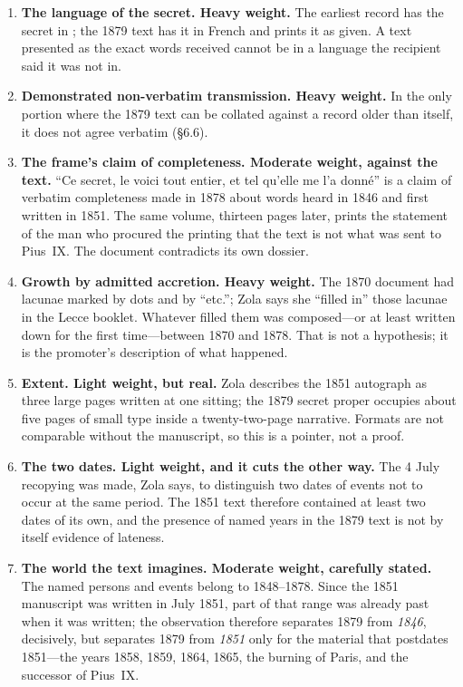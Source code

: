 \begin{enumerate}[leftmargin=1.4em,itemsep=0.3em,topsep=0.3em]
\item \textbf{The language of the secret. Heavy weight.} The
earliest record has the secret in ; the 1879 text has
it in French and prints it as given. A text presented as the exact
words received cannot be in a language the recipient said it was not
in.
\item \textbf{Demonstrated non-verbatim transmission. Heavy
weight.} In the only portion where the 1879 text can be collated
against a record older than itself, it does not agree verbatim
(\S6.6).
\item \textbf{The frame's claim of completeness. Moderate weight,
against the text.} ``Ce secret, le voici tout entier, et tel qu'elle
me l'a donné'' is a claim of verbatim completeness made in 1878
about words heard in 1846 and first written in 1851. The same
volume, thirteen pages later, prints the statement of the man who
procured the printing that the text is not what was sent to Pius~IX.
The document contradicts its own dossier.
\item \textbf{Growth by admitted accretion. Heavy weight.} The 1870
document had lacunae marked by dots and by ``etc.''; Zola says she
``filled in'' those lacunae in the Lecce booklet. Whatever filled
them was composed---or at least written down for the first
time---between 1870 and 1878. That is not a hypothesis; it is the
promoter's description of what happened.
\item \textbf{Extent. Light weight, but real.} Zola describes the
1851 autograph as three large pages written at one sitting; the 1879
secret proper occupies about five pages of small type inside a
twenty-two-page narrative. Formats are not comparable without the
manuscript, so this is a pointer, not a proof.
\item \textbf{The two dates. Light weight, and it cuts the other
way.} The 4 July recopying was made, Zola says, to distinguish two
dates of events not to occur at the same period. The 1851 text
therefore contained at least two dates of its own, and the presence
of named years in the 1879 text is not by itself evidence of
lateness.
\item \textbf{The world the text imagines. Moderate weight,
carefully stated.} The named persons and events belong to
1848--1878. Since the 1851 manuscript was written in July 1851, part
of that range was already past when it was written; the observation
therefore separates 1879 from \emph{1846}, decisively, but separates
1879 from \emph{1851} only for the material that postdates 1851---the
years 1858, 1859, 1864, 1865, the burning of Paris, and the
successor of Pius~IX.
\end{enumerate}

